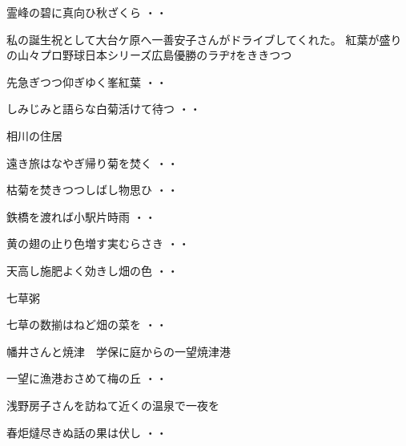 \begin{shiika}霊峰の碧に真向ひ秋ざくら
\hfill{・・}\end{shiika}
\vspace{0.6cm}
私の誕生祝として大台ケ原へ一善安子さんがドライブしてくれた。
紅葉が盛りの山々プロ野球日本シリーズ広島優勝のラヂｵをききつつ
\begin{shiika}先急ぎつつ仰ぎゆく峯紅葉
\hfill{・・}\end{shiika}
\vspace{0.6cm}
\begin{shiika}しみじみと語らな白菊活けて待つ
\hfill{・・}\end{shiika}
\vspace{0.6cm}
相川の住居
\begin{shiika}遠き旅はなやぎ帰り菊を焚く
\hfill{・・}\end{shiika}
\begin{shiika}枯菊を焚きつつしばし物思ひ
\hfill{・・}\end{shiika}
\begin{shiika}鉄橋を渡れば小駅片時雨
\hfill{・・}\end{shiika}
\begin{shiika}黄の翅の止り色増す実むらさき
\hfill{・・}\end{shiika}
\begin{shiika}天高し施肥よく効きし畑の色
\hfill{・・}\end{shiika}
\vspace{0.6cm}
七草粥
\begin{shiika}七草の数揃はねど畑の菜を
\hfill{・・}\end{shiika}
\vspace{0.6cm}
幡井さんと焼津　学保に庭からの一望焼津港
\begin{shiika}一望に漁港おさめて梅の丘
\hfill{・・}\end{shiika}
\vspace{0.6cm}
浅野房子さんを訪ねて近くの温泉で一夜を
\begin{shiika}春炬燵尽きぬ話の果は伏し
\hfill{・・}\end{shiika}
\vspace{0.6cm}
